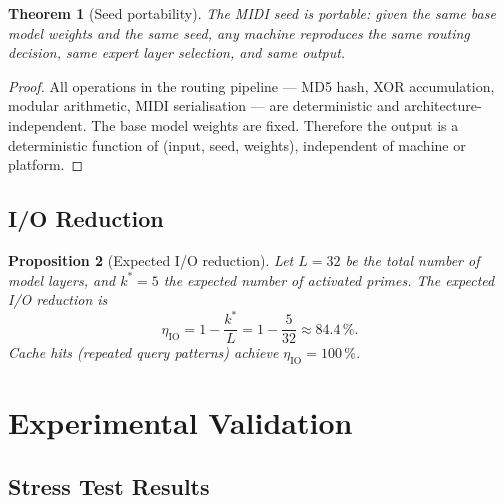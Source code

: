 \documentclass[12pt,a4paper]{article}
\theoremstyle{plain}
\newtheorem{theorem}{Theorem}[section]
\newtheorem{proposition}[theorem]{Proposition}
\theoremstyle{definition}
\theoremstyle{remark}
\begin{document}
\begin{theorem}[Seed portability]
The MIDI seed is \emph{portable}: given the same base model weights
and the same seed, any machine reproduces the same routing decision,
same expert layer selection, and same output.
\end{theorem}

\begin{proof}
All operations in the routing pipeline --- MD5 hash, XOR accumulation,
modular arithmetic, MIDI serialisation --- are deterministic and
architecture-independent.  The base model weights are fixed.
Therefore the output is a deterministic function of (input, seed,
weights), independent of machine or platform.
\end{proof}

\subsection{I/O Reduction}

\begin{proposition}[Expected I/O reduction]
Let $L = 32$ be the total number of model layers, and $k^*=5$ the
expected number of activated primes.  The expected I/O reduction is
\begin{equation}
\eta_{\text{IO}} = 1 - \frac{k^*}{L} = 1 - \frac{5}{32} \approx 84.4\,\%.
\label{eq:io-reduction}
\end{equation}
Cache hits (repeated query patterns) achieve $\eta_{\text{IO}} = 100\,\%$.
\end{proposition}

\section{Experimental Validation}
\label{sec:validation}

\subsection{Stress Test Results}
\end{document}

